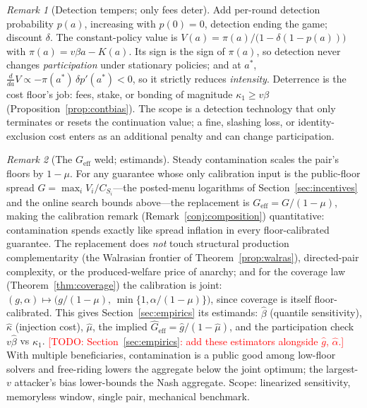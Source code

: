 \documentclass[11pt]{article}
\newcommand{\todo}[1]{\textcolor{red}{[TODO: #1]}}
\theoremstyle{remark}
\newtheorem{remark}{Remark}
\begin{document}
\begin{remark}[Detection tempers; only fees deter]\label{rem:detection}
Add per-round detection probability $p(a)$, increasing with $p(0)=0$,
detection ending the game; discount $\delta$. The constant-policy value
is $V(a)=\pi(a)/\big(1-\delta(1-p(a))\big)$ with
$\pi(a)=v\beta a-K(a)$. Its sign is the sign of $\pi(a)$, so detection
never changes \emph{participation} under stationary policies; and at
$a^\ast$, $\frac{d}{da}V\propto-\pi(a^\ast)\,\delta p'(a^\ast)<0$, so it
strictly reduces \emph{intensity}. Deterrence is the cost floor's job:
fees, stake, or bonding of magnitude $\kappa_1\ge v\beta$
(Proposition~\ref{prop:contbias}). The scope is a detection technology
that only terminates or resets the continuation value; a fine, slashing
loss, or identity-exclusion cost enters as an additional penalty and can
change participation.
\end{remark}

\begin{remark}[The $G_{\mathrm{eff}}$ weld; estimands]\label{rem:weld}
Steady contamination scales the pair's floors by $1-\mu$. For any
guarantee whose only calibration input is the public-floor spread
$G=\max_iV_i/C_{S_i}$---the posted-menu logarithms of
Section~\ref{sec:incentives} and the online search bounds above---the
replacement is $G_{\mathrm{eff}}=G/(1-\mu)$, making the calibration
remark (Remark~\ref{conj:composition}) quantitative: contamination
spends exactly like spread inflation in every floor-calibrated
guarantee. The replacement does \emph{not} touch structural production
complementarity (the Walrasian frontier of
Theorem~\ref{prop:walras}), directed-pair complexity, or the
produced-welfare price of anarchy; and for the coverage law
(Theorem~\ref{thm:coverage}) the calibration is joint:
$(g,\alpha)\mapsto\big(g/(1-\mu),\,\min\{1,\alpha/(1-\mu)\}\big)$,
since coverage is itself floor-calibrated. This gives
Section~\ref{sec:empirics} its estimands: $\widehat\beta$ (quantile
sensitivity), $\widehat\kappa$ (injection cost), $\widehat\mu$, the
implied $\widehat G_{\mathrm{eff}}=\widehat g/(1-\widehat\mu)$, and the
participation check $v\widehat\beta$ vs $\kappa_1$.
\todo{Section~\ref{sec:empirics}: add these estimators alongside
$\widehat g$, $\widehat\alpha$.} With multiple beneficiaries,
contamination is a public good among low-floor solvers and free-riding
lowers the aggregate below the joint optimum; the largest-$v$ attacker's
bias lower-bounds the Nash aggregate. Scope: linearized sensitivity,
memoryless window, single pair, mechanical benchmark.
\end{remark}
\end{document}
